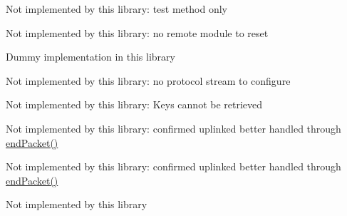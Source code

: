 \begin{DoxyRefList}
%
 Not implemented by this library\+: test method only  
\item[Member \mbox{\hyperlink{classSTM32LoRaWAN_a619ee70f32e4ad240c67af514750ffed}{S\+T\+M32\+Lo\+Ra\+W\+AN::factory\+Default}} ()]\label{extensions__extensions000020}%
%
 Not implemented by this library\+: no remote module to reset  
\item[Member \mbox{\hyperlink{classSTM32LoRaWAN_a730063277eca759fda3c67bc144568a1}{S\+T\+M32\+Lo\+Ra\+W\+AN::flush}} ()]\label{extensions__extensions000029}%
%
 Dummy implementation in this library  
\item[Member \mbox{\hyperlink{classSTM32LoRaWAN_a3eff0f30e2bf1ea1f046c81bcbedecfe}{S\+T\+M32\+Lo\+Ra\+W\+AN::format}} (bool hex\+Mode)]\label{extensions__extensions000021}%
%
 Not implemented by this library\+: no protocol stream to configure  
\item[Member \mbox{\hyperlink{classSTM32LoRaWAN_a0c818ce976451d7ce17f5c4630d109dd}{S\+T\+M32\+Lo\+Ra\+W\+AN::get\+App\+S\+Key}} ()]\label{extensions__extensions000026}%
%
 Not implemented by this library\+: Keys cannot be retrieved  
\item[Member \mbox{\hyperlink{classSTM32LoRaWAN_a1b8fbaeab4917b93e3f240133835d3e3}{S\+T\+M32\+Lo\+Ra\+W\+AN::get\+C\+FM}} ()]\label{extensions__extensions000009}%
%
 Not implemented by this library\+: confirmed uplinked better handled through \mbox{\hyperlink{classSTM32LoRaWAN_a816dd9c8b223bda9380971c5a1dab377}{end\+Packet()}}  
\item[Member \mbox{\hyperlink{classSTM32LoRaWAN_a58632ff20ab6a0f48fa772c827d73cde}{S\+T\+M32\+Lo\+Ra\+W\+AN::get\+C\+FS}} ()]\label{extensions__extensions000010}%
%
 Not implemented by this library\+: confirmed uplinked better handled through \mbox{\hyperlink{classSTM32LoRaWAN_a816dd9c8b223bda9380971c5a1dab377}{end\+Packet()}}  
\item[Member \mbox{\hyperlink{classSTM32LoRaWAN_a840faf34c5bcef2a58420095dc78d691}{S\+T\+M32\+Lo\+Ra\+W\+AN::get\+F\+CD}} ()]\label{extensions__extensions000007}%
%
 Not implemented by this library  
\item[Member \mbox{\hyperlink{classSTM32LoRaWAN_a23c34cb2f59e5c27ea67fe755373bbc5}{S\+T\+M32\+Lo\+Ra\+W\+AN::get\+F\+CU}} ()]\label{extensions__extensions000005}%

\end{DoxyRefList}

